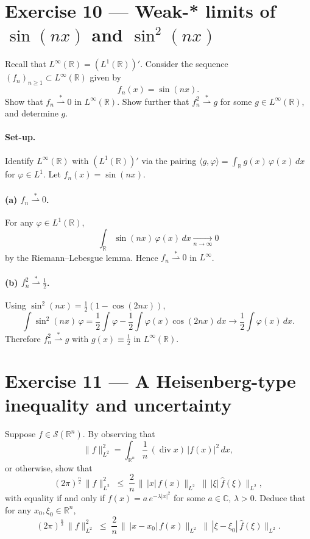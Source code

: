 \documentclass[12pt,a4paper]{article}
\theoremstyle{plain}
\theoremstyle{definition}
\theoremstyle{remark}
\theoremstyle{remark}
\begin{document}
\clearpage

\section*{Exercise 10 — Weak-* limits of $\sin(nx)$ and $\sin^2(nx)$}

Recall that $L^\infty(\mathbb R)=(L^1(\mathbb R))'$. Consider the sequence $(f_n)_{n\ge1}\subset L^\infty(\mathbb R)$ given by
\[
f_n(x)=\sin(nx).
\]
Show that $f_n \stackrel{*}{\rightharpoonup} 0$ in $L^\infty(\mathbb R)$.  
Show further that $f_n^2 \stackrel{*}{\rightharpoonup} g$ for some $g\in L^\infty(\mathbb R)$, and determine $g$.


\paragraph{Set-up.}
Identify $L^\infty(\mathbb R)$ with $(L^1(\mathbb R))'$ via the pairing
$\langle g,\varphi\rangle=\int_{\mathbb R} g(x)\,\varphi(x)\,dx$ for $\varphi\in L^1$.
Let $f_n(x)=\sin(nx)$.

\smallskip

\paragraph{(a) $f_n \overset{*}\rightharpoonup 0$.}
For any $\varphi\in L^1(\mathbb R)$,
\[
\int_{\mathbb R}\sin(nx)\,\varphi(x)\,dx \xrightarrow[n\to\infty]{} 0
\]
by the Riemann--Lebesgue lemma. Hence $f_n \overset{*}\rightharpoonup 0$ in $L^\infty$.

\smallskip

\paragraph{(b) $f_n^2 \overset{*}\rightharpoonup \tfrac12$.}
Using $\sin^2(nx)=\frac12(1-\cos(2nx))$,
\[
\int \sin^2(nx)\,\varphi
= \frac12\int \varphi - \frac12\int \varphi(x)\cos(2nx)\,dx
\longrightarrow \frac12\int \varphi(x)\,dx.
\]
Therefore $f_n^2 \overset{*}\rightharpoonup g$ with $g(x)\equiv \frac12$ in $L^\infty(\mathbb R)$.

\bigskip
\bigskip

\section*{Exercise 11 — A Heisenberg-type inequality and uncertainty}

Suppose $f\in \mathcal S(\mathbb R^n)$. By observing that
\[
\|f\|_{L^2}^2
=\int_{\mathbb R^n}\frac{1}{n}\,(\operatorname{div}x)\,|f(x)|^2\,dx,
\]
or otherwise, show that
\[
(2\pi)^{\frac n2}\,\|f\|_{L^2}^2
\;\le\; \frac{2}{n}\,\big\|\,|x|\,f(x)\big\|_{L^2}\;\big\|\,|\xi|\,\widehat f(\xi)\big\|_{L^2},
\]
with equality if and only if $f(x)=a\,e^{-\lambda|x|^2}$ for some $a\in\mathbb C$, $\lambda>0$.
Deduce that for any $x_0,\xi_0\in\mathbb R^n$,
\[
(2\pi)^{\frac n2}\,\|f\|_{L^2}^2
\;\le\; \frac{2}{n}\,\big\|\,|x-x_0|\,f(x)\big\|_{L^2}\;\big\|\,|\xi-\xi_0|\,\widehat f(\xi)\big\|_{L^2}.
\]
\end{document}
